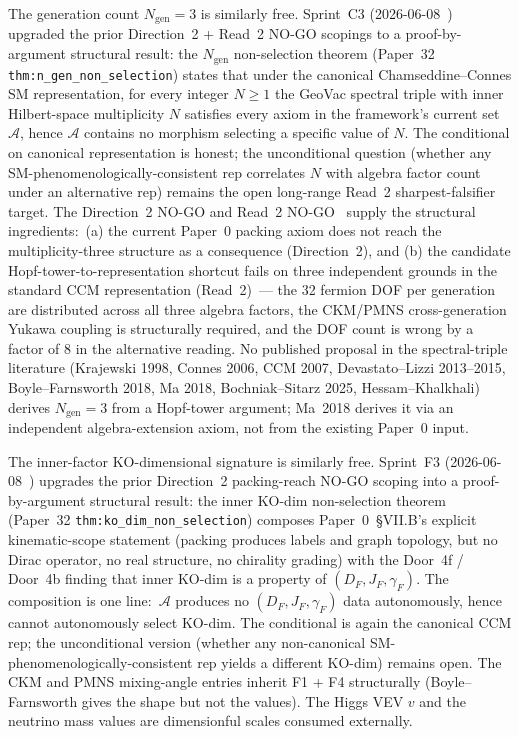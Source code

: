 \documentclass[11pt,a4paper]{article}
\theoremstyle{plain}
\theoremstyle{definition}
\newcommand{\Ngen}{N_{\mathrm{gen}}}
\begin{document}
The generation count $\Ngen = 3$ is similarly free. Sprint~C3 (2026-06-08~\cite{debug_c3}) upgraded the prior Direction~2 + Read~2 NO-GO scopings to a proof-by-argument structural result:  the $N_{\mathrm{gen}}$ non-selection theorem (Paper~32 \texttt{thm:n\_gen\_non\_selection}) states that under the canonical Chamseddine--Connes SM representation, for every integer $N \ge 1$ the GeoVac spectral triple with inner Hilbert-space multiplicity $N$ satisfies every axiom in the framework's current set $\mathcal{A}$, hence $\mathcal{A}$ contains no morphism selecting a specific value of $N$. The conditional on canonical representation is honest; the unconditional question (whether any SM-phenomenologically-consistent rep correlates $N$ with algebra factor count under an alternative rep) remains the open long-range Read~2 sharpest-falsifier target. The Direction~2 NO-GO and Read~2 NO-GO~\cite{debug_seam_packing,debug_read2} supply the structural ingredients:\ (a) the current Paper~0 packing axiom does not reach the multiplicity-three structure as a consequence (Direction~2), and (b) the candidate Hopf-tower-to-representation shortcut fails on three independent grounds in the standard CCM representation (Read~2)\ --- the 32 fermion DOF per generation are distributed across all three algebra factors, the CKM/PMNS cross-generation Yukawa coupling is structurally required, and the DOF count is wrong by a factor of 8 in the alternative reading. No published proposal in the spectral-triple literature (Krajewski 1998, Connes 2006, CCM 2007, Devastato--Lizzi 2013--2015, Boyle--Farnsworth 2018, Ma 2018, Bochniak--Sitarz 2025, Hessam--Khalkhali) derives $\Ngen = 3$ from a Hopf-tower argument; Ma~2018 derives it via an independent algebra-extension axiom, not from the existing Paper~0 input.

The inner-factor KO-dimensional signature is similarly free. Sprint~F3 (2026-06-08~\cite{debug_f3}) upgrades the prior Direction~2 packing-reach NO-GO scoping into a proof-by-argument structural result:  the inner KO-dim non-selection theorem (Paper~32 \texttt{thm:ko\_dim\_non\_selection}) composes Paper~0~\S VII.B's explicit kinematic-scope statement (packing produces labels and graph topology, but no Dirac operator, no real structure, no chirality grading) with the Door~4f / Door~4b finding that inner KO-dim is a property of $(D_F, J_F, \gamma_F)$. The composition is one line:\ $\mathcal{A}$ produces no $(D_F, J_F, \gamma_F)$ data autonomously, hence cannot autonomously select KO-dim. The conditional is again the canonical CCM rep; the unconditional version (whether any non-canonical SM-phenomenologically-consistent rep yields a different KO-dim) remains open. The CKM and PMNS mixing-angle entries inherit F1 + F4 structurally (Boyle--Farnsworth gives the shape but not the values). The Higgs VEV $v$ and the neutrino mass values are dimensionful scales consumed externally.
\end{document}
